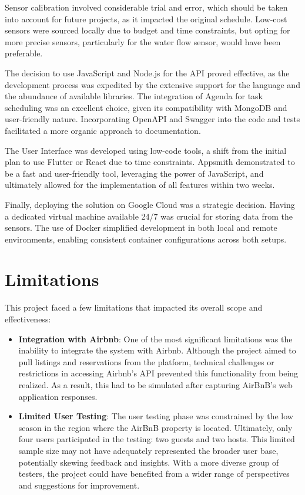 Sensor calibration involved considerable trial and error, which should be taken into account for future projects, as it 
impacted the original schedule. Low-cost sensors were sourced locally due to budget and time constraints, but opting for 
more precise sensors, particularly for the water flow sensor, would have been preferable.

The decision to use JavaScript and Node.js for the API proved effective, as the development process was expedited by the 
extensive support for the language and the abundance of available libraries. The integration of Agenda for task 
scheduling was an excellent choice, given its compatibility with MongoDB and user-friendly nature. Incorporating OpenAPI 
and Swagger into the code and tests facilitated a more organic approach to documentation.

The User Interface was developed using low-code tools, a shift from the initial plan to use Flutter \cite{Flutter2024} 
or React \cite{React2024} due to time constraints. Appsmith demonstrated to be a fast and user-friendly tool, leveraging 
the power of JavaScript, and ultimately allowed for the implementation of all features within two weeks.

Finally, deploying the solution on Google Cloud was a strategic decision. Having a dedicated virtual machine available 
24/7 was crucial for storing data from the sensors. The use of Docker simplified development in both local and remote 
environments, enabling consistent container configurations across both setups.

\section{Limitations}

This project faced a few limitations that impacted its overall scope and effectiveness:

\begin{itemize}
    \item \textbf{Integration with Airbnb}: One of the most significant limitations was the inability to integrate the 
    system with Airbnb. Although the project aimed to pull listings and reservations from the platform, technical 
    challenges or restrictions in accessing Airbnb's API prevented this functionality from being realized. As a result, 
    this had to be simulated after capturing AirBnB's web application responses.
    \item \textbf{Limited User Testing}: The user testing phase was constrained by the low season in the region where 
    the AirBnB property is located. Ultimately, only four users participated in the testing: two guests and two hosts. 
    This limited sample size may not have adequately represented the broader user base, potentially skewing feedback and 
    insights. With a more diverse group of testers, the project could have benefited from a wider range of perspectives 
    and suggestions for improvement.
\end{itemize}